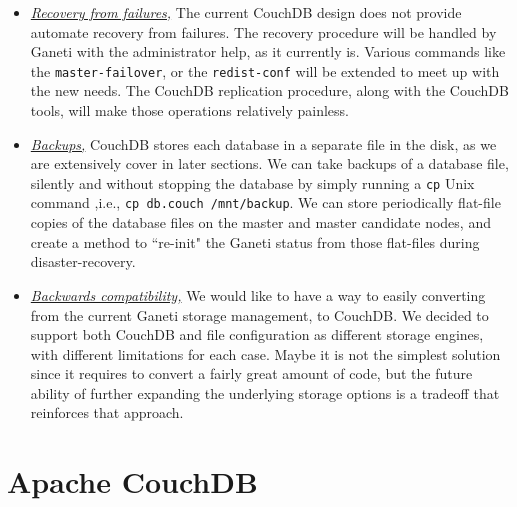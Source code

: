 \begin{itemize}
    concurrent, functional programming language with an emphasis on
    fault-tolerance reinforces the succeed of the data safety goal. Its internal
    structure is fault-tolerant, and failures occur in a controlled environment
    and are dealt without letting single problems cascade to the whole system,
    but are isolated in single requests. For CouchDB specifically, if an
    operation fails, we will never end up in a state with partially updated
    objects, or corrupted objects that was previously written successfully to
    the server. It provides a total reliable storage engine, which we will
    extensively present in section~\ref{sec:couch}.
  \item \underline{\emph{Recovery from failures,}} The current CouchDB design
    does not provide automate recovery from failures. The recovery procedure
    will be handled by Ganeti with the administrator help, as it currently is.
    Various commands like the \texttt{master-failover}, or the
    \texttt{redist-conf} will be extended to meet up with the new needs. The
    CouchDB replication procedure, along with the CouchDB tools, will make
    those operations relatively painless.
  \item \underline{\emph{Backups,}} CouchDB stores each database in a separate
    file in the disk, as we are extensively cover in later sections. We can take
    backups of a database file, silently and without stopping the database by
    simply running a \texttt{cp} Unix command ,i.e., \texttt{cp db.couch
    /mnt/backup}. We can store periodically flat-file copies of the database
    files on the master and master candidate nodes, and create a method to
    ``re-init" the Ganeti status from those flat-files during disaster-recovery.
  \item \underline{\emph{Backwards compatibility,}} We would like to have a way
    to easily converting from the current Ganeti storage management, to CouchDB.
    We decided to support both CouchDB and file configuration as different
    storage engines, with different limitations for each case. Maybe it is not
    the simplest solution since it requires to convert a fairly great amount of
    code, but the future ability of further expanding the underlying storage
    options is a tradeoff that reinforces that approach.
\end{itemize}

\section{Apache CouchDB}\label{sec:couch}

